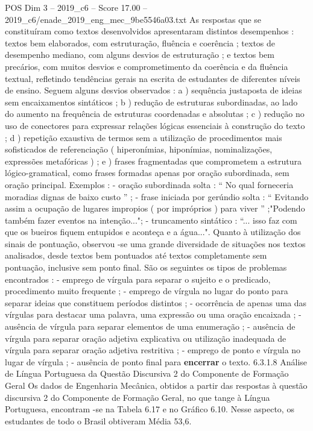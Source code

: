 \begin{textsample}{POS Dim 3 – 2019\_c6 – Score 17.00 – 2019\_c6/enade\_2019\_eng\_mec\_9be5546a03.txt}
As respostas que se constituíram como textos desenvolvidos apresentaram distintos desempenhos : textos bem elaborados, com estruturação, fluência e coerência ; textos de desempenho mediano, com alguns desvios de estruturação ; e textos bem precários, com muitos desvios e comprometimento da coerência e da fluência textual, refletindo tendências gerais na escrita de estudantes de diferentes níveis de ensino.
Seguem alguns desvios observados : a ) sequência justaposta de ideias sem encaixamentos sintáticos ; b ) redução de estruturas subordinadas, ao lado do aumento na frequência de estruturas coordenadas e absolutas ; c ) redução no uso de conectores para expressar relações lógicas essenciais à construção do texto ; d ) repetição exaustiva de termos sem a utilização de procedimentos mais sofisticados de referenciação ( hiperonímias, hiponímias, nominalizações, expressões metafóricas ) ; e ) frases fragmentadas que comprometem a estrutura lógico-gramatical, como frases formadas apenas por oração subordinada, sem oração principal.
Exemplos : - oração subordinada solta : “ No qual forneceria moradias dignas de baixo custo ” ; - frase iniciada por gerúndio solta : “ Evitando assim a ocupação de lugares impropios ( por impróprios ) para viver ” ;"Podendo também fazer eventos na intenção..."; - truncamento sintático : “... isso faz com que os bueiros fiquem entupidos e aconteça e a água...".
Quanto à utilização dos sinais de pontuação, observou -se uma grande diversidade de situações nos textos analisados, desde textos bem pontuados até textos completamente sem pontuação, inclusive sem ponto final.
São os seguintes os tipos de problemas encontrados : - emprego de vírgula para separar o sujeito e o predicado, procedimento muito frequente ; - emprego de vírgula no lugar do ponto para separar ideias que constituem períodos distintos ; - ocorrência de apenas uma das vírgulas para destacar uma palavra, uma expressão ou uma oração encaixada ; - ausência de vírgula para separar elementos de uma enumeração ; - ausência de vírgula para separar oração adjetiva explicativa ou utilização inadequada de vírgula para separar oração adjetiva restritiva ; - emprego de ponto e vírgula no lugar de vírgula ; - ausência de ponto final para \textbf{encerrar} o texto. 6.3.1.8 Análise de Língua Portuguesa da Questão Discursiva 2 do Componente de Formação Geral Os dados de Engenharia Mecânica, obtidos a partir das respostas à questão discursiva 2 do Componente de Formação Geral, no que tange à Língua Portuguesa, encontram -se na Tabela 6.17 e no Gráfico 6.10.
Nesse aspecto, os estudantes de todo o Brasil obtiveram Média 53,6.

\end{textsample}
